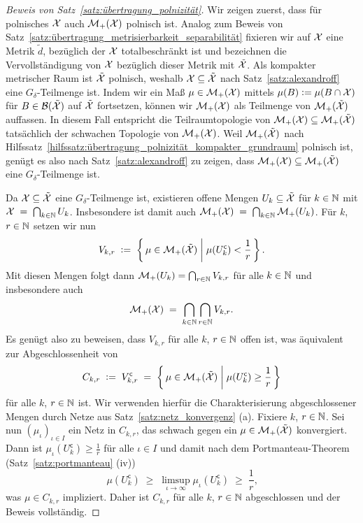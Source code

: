 \documentclass[../thesis/thesis.tex]{subfiles}
\begin{document}
	\begin{proof}[Beweis von Satz~\ref{satz:übertragung_polnizität}]
		Wir zeigen zuerst, dass für polnisches $\mathcal{X}$ auch $\mathcal{M}_{+}(\mathcal{X})$ polnisch ist. Analog zum Beweis von Satz~\ref{satz:übertragung_metrisierbarkeit_separabilität} fixieren wir auf 
		$\mathcal{X}$ eine Metrik $\tilde{d}$, bezüglich der $\mathcal{X}$ totalbeschränkt ist und
		bezeichnen die Vervollständigung von $\mathcal{X}$ bezüglich dieser Metrik mit $\tilde{\mathcal{X}}$. Als kompakter metrischer Raum ist $\tilde{\mathcal{X}}$ polnisch, weshalb $\mathcal{X} \subseteq \tilde{\mathcal{X}}$
		nach Satz~\ref{satz:alexandroff} eine $G_\delta$-Teilmenge ist. Indem wir ein Maß $\mu \in \mathcal{M}_{+}(\mathcal{X})$ mittels 
		$\mu(B) \vcentcolon = \mu(B \cap \mathcal{X})$ für $B \in \mathcal{B}(\tilde{\mathcal{X}})$ auf $\tilde{\mathcal{X}}$ fortsetzen, können wir $\mathcal{M}_{+}(\mathcal{X})$ als Teilmenge von $\mathcal{M}_{+}(\tilde{\mathcal{X}})$
		auffassen. In diesem Fall entspricht die Teilraumtopologie von $\mathcal{M}_{+}(\mathcal{X}) \subseteq \mathcal{M}_{+}(\tilde{\mathcal{X}})$ tatsächlich der schwachen Topologie von $\mathcal{M}_{+}(\mathcal{X})$. Weil $\mathcal{M}_{+}(\tilde{\mathcal{X}})$ nach 
		Hilfssatz~\ref{hilfssatz:übertragung_polnizität_kompakter_grundraum} polnisch ist, genügt es also nach Satz~\ref{satz:alexandroff} zu zeigen, 
		dass $\mathcal{M}_{+}(\mathcal{X}) \subseteq \mathcal{M}_{+}(\tilde{\mathcal{X}})$ eine $G_\delta$-Teilmenge ist.
		
		Da $\mathcal{X} \subseteq \tilde{\mathcal{X}}$ eine $G_\delta$-Teilmenge ist, existieren offene Mengen $U_k \subseteq \tilde{\mathcal{X}}$ für $k \in \mathbb{N}$ mit 
		$\mathcal{X} \; = \; \bigcap_{k \in \mathbb{N}} U_k$. Insbesondere ist damit auch
		$\mathcal{M}_{+}(\mathcal{X}) \; = \; \bigcap_{k \in \mathbb{N}} \mathcal{M}_{+}(U_k)$.
		Für $k$, $r \in \mathbb{N}$ setzen wir nun
		\[ V_{k, r} \; \vcentcolon = \; \left\{\, \mu \in \mathcal{M}_{+}(\tilde{\mathcal{X}}) \; \middle| \; \mu(U_k^{\mathsf{c}}) < \frac{1}{r} \,\right\} \text{.} \]
		Mit diesen Mengen folgt dann $\mathcal{M}_{+}(U_k) = \bigcap_{r \in \mathbb{N}} V_{k, r}$ für alle $k \in \mathbb{N}$ und insbesondere auch
		\[ \mathcal{M}_{+}(\mathcal{X}) \; = \; \bigcap_{k \in \mathbb{N}} \bigcap_{r \in \mathbb{N}} V_{k, r} \text{.} \]
		Es genügt also zu beweisen, dass $V_{k, r}$ für alle $k$, $r \in \mathbb{N}$ offen ist, was äquivalent zur Abgeschlossenheit von 
		\[C_{k, r} \; \vcentcolon = \; V_{k, r}^{\mathsf{c}} \; = \; \left\{\, \mu \in \mathcal{M}_{+}(\tilde{\mathcal{X}}) \; \middle| \; \mu(U_k^{\mathsf{c}}) \geq \frac{1}{r} \,\right\} \] 
		für alle $k$, $r \in \mathbb{N}$ ist. Wir verwenden hierfür die Charakterisierung abgeschlossener Mengen durch Netze aus Satz~\ref{satz:netz_konvergenz} (a).
		Fixiere $k$, $r \in \mathbb{N}$. Sei nun $(\mu_\iota)_{\iota \in I}$ ein Netz in $C_{k, r}$, das schwach gegen ein $\mu \in \mathcal{M}_{+}(\tilde{\mathcal{X}})$ konvergiert.
		Dann ist $\mu_\iota(U_k^{\mathsf{c}}) \geq \frac{1}{r}$ für alle $\iota \in I$ und damit nach dem Portmanteau-Theorem (Satz~\ref{satz:portmanteau} (iv))
		\[ \mu(U_k^{\mathsf{c}}) \; \geq \; \limsup_{\iota \to \infty} \mu_\iota(U_k^{\mathsf{c}}) \; \geq \; \frac{1}{r} \text{,} \]
		was $\mu \in C_{k, r}$ impliziert. Daher ist $C_{k, r}$ für alle $k$, $r \in \mathbb{N}$ abgeschlossen und der Beweis vollständig.
		

\end{proof}
\end{document}
